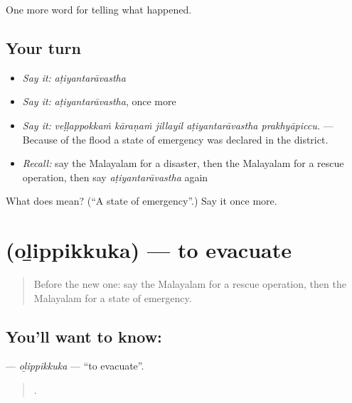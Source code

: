 \begin{grammarlens}[title={What you've built}]
One more word for telling what happened.
\end{grammarlens}

\subsection*{Your turn}
\begin{itemize}
\raggedright
  \item \emph{Say it:} \emph{aṭiyantarāvastha}
  \item \emph{Say it:} \emph{aṭiyantarāvastha}, once more
  \item \emph{Say it:} \emph{veḷḷappokkaṁ kāraṇaṁ jillayil aṭiyantarāvastha prakhyāpiccu.} — Because of the flood a state of emergency was declared in the district.
  \item \emph{Recall:} say the Malayalam for a disaster, then the Malayalam for a rescue operation, then say \emph{aṭiyantarāvastha} again
\end{itemize}

\begin{tcolorbox}[breakable,colback=teal!4,colframe=teal!35!black,title={Before you move on}]
What does  mean? (\textquotedblleft{}A state of emergency\textquotedblright{}.) Say it once more.
\end{tcolorbox}
\section[\texorpdfstring{\ml{ഒഴിപ്പിക്കുക} (oḻippikkuka)}{ഒഴിപ്പിക്കുക (oḻippikkuka)}]{ (oḻippikkuka) — to evacuate}

\label{lesson:ML-C374-olippikkuka}



\begin{quote}
Before the new one: say the Malayalam for a rescue operation, then the Malayalam for a state of emergency.
\end{quote}

\subsection*{You'll want to know: }
\textbf{} — \emph{oḻippikkuka} — \textquotedblleft{}to evacuate\textquotedblright{}.

\begin{quote}
   .
\end{quote}

